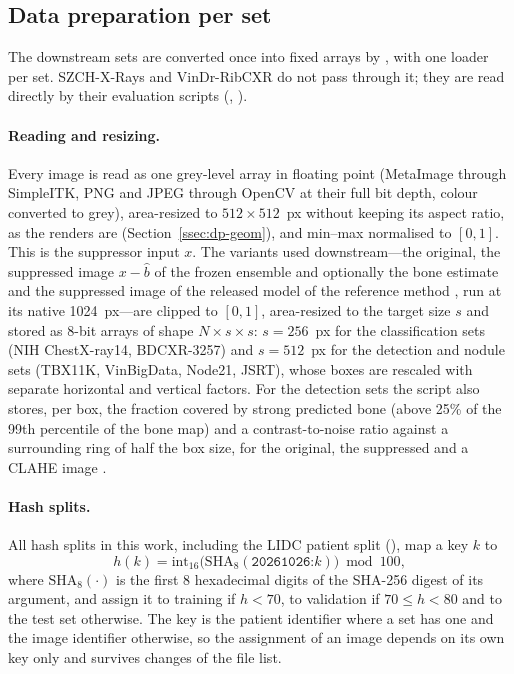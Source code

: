 \subsection{Data preparation per set}
\label{ssec:dp-prep}
The downstream sets are converted once into fixed arrays by , with one loader per set. SZCH-X-Rays and VinDr-RibCXR do not
pass through it; they are read directly by their evaluation scripts (, ).

\paragraph{Reading and resizing.} Every image is read as one grey-level array in floating point (MetaImage through SimpleITK, PNG and JPEG
through OpenCV at their full bit depth, colour converted to grey), area-resized to $512\times512$~px without keeping its aspect ratio, as the
renders are (Section~\ref{ssec:dp-geom}), and min--max normalised to $[0,1]$. This is the suppressor input $x$. The variants used downstream---the
original, the suppressed image $x-\hat b$ of the frozen ensemble and optionally the bone estimate and the suppressed image of the released model of
the reference method \citep{angaitkar2026anatomy}, run at its native 1024~px---are clipped to $[0,1]$, area-resized to the target size $s$ and
stored as 8-bit arrays of shape $N\times s\times s$: $s=256$~px for the classification sets (NIH ChestX-ray14, BDCXR-3257) and $s=512$~px for the
detection and nodule sets (TBX11K, VinBigData, Node21, JSRT), whose boxes are rescaled with separate horizontal and vertical factors. For the
detection sets the script also stores, per box, the fraction covered by strong predicted bone (above 25\% of the 99th percentile of the bone map)
and a contrast-to-noise ratio against a surrounding ring of half the box size, for the original, the suppressed and a CLAHE image
\citep{zuiderveld1994clahe}.

\paragraph{Hash splits.} All hash splits in this work, including the LIDC patient split (), map a key $k$ to
\begin{equation}
  h(k) = \mathrm{int}_{16}\big(\mathrm{SHA}_8(\texttt{20261026:}k)\big) \bmod 100,
  \label{eq:dp-hash}
\end{equation}
where $\mathrm{SHA}_8(\cdot)$ is the first 8 hexadecimal digits of the SHA-256 digest of its argument,
and assign it to training if $h<70$, to validation if $70\le h<80$ and to the test set otherwise. The key is the patient identifier where a set has
one and the image identifier otherwise, so the assignment of an image depends on its own key only and survives changes of the file list.

